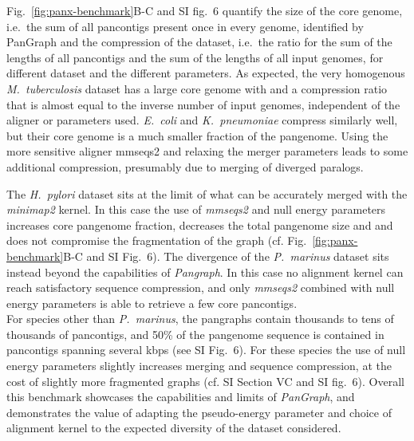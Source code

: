\documentclass[aps,rmp,preprint,superscriptaddress,10pt,linenumbers]{revtex4-1}
\newcommand{\SIdataBenchmark}{V}
\newcommand{\SIfigBenchmark}{6}
\begin{document}
Fig.~\ref{fig:panx-benchmark}B-C and SI fig.~{\SIfigBenchmark} quantify the size of the core genome, i.e.~the sum of all pancontigs present once in every genome, identified by PanGraph and the compression of the dataset, i.e.~the ratio for the sum of the lengths of all pancontigs and the sum of the lengths of all input genomes, for different dataset and the different parameters.
As expected, the very homogenous \textit{M.~tuberculosis} dataset has a large core genome with and a compression ratio that is almost equal to the inverse number of input genomes, independent of the aligner or parameters used.
\textit{E.~coli} and \textit{K.~pneumoniae} compress similarly well, but their core genome is a much smaller fraction of the pangenome.
Using the more sensitive aligner mmseqs2 and relaxing the merger parameters leads to some additional compression, presumably due to merging of diverged paralogs.

The \textit{H.~pylori}  dataset sits at the limit of what can be accurately merged with the \textit{minimap2} kernel.
In this case the use of \textit{mmseqs2} and null energy parameters increases core pangenome fraction, decreases the total pangenome size and and does not compromise the fragmentation of the graph (cf. Fig.~\ref{fig:panx-benchmark}B-C and SI Fig.~{\SIfigBenchmark}).
The divergence of the \textit{P.~marinus} dataset sits instead beyond the capabilities of \textit{Pangraph}. In this case no alignment kernel can reach satisfactory sequence compression, and only \textit{mmseqs2} combined with null energy parameters is able to retrieve a few core pancontigs.\\

For species other than \textit{P.~marinus}, the pangraphs contain thousands to tens of thousands of pancontigs, and 50\% of the pangenome sequence is contained in pancontigs spanning several kbps (see SI Fig.~\SIfigBenchmark).
For these species the use of null energy parameters slightly increases merging and sequence compression, at the cost of slightly more fragmented graphs (cf. SI Section {\SIdataBenchmark}C and SI fig.~\SIfigBenchmark).
Overall this benchmark showcases the capabilities and limits of \textit{PanGraph}, and demonstrates the value of adapting the pseudo-energy parameter and choice of alignment kernel to the expected diversity of the dataset considered.
\end{document}
